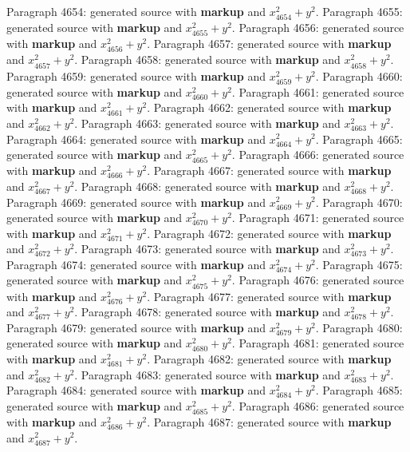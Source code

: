 \documentclass{article}
\begin{document}
Paragraph 4654: generated source with \textbf{markup} and $x_{4654}^2 + y^2$.
Paragraph 4655: generated source with \textbf{markup} and $x_{4655}^2 + y^2$.
Paragraph 4656: generated source with \textbf{markup} and $x_{4656}^2 + y^2$.
Paragraph 4657: generated source with \textbf{markup} and $x_{4657}^2 + y^2$.
Paragraph 4658: generated source with \textbf{markup} and $x_{4658}^2 + y^2$.
Paragraph 4659: generated source with \textbf{markup} and $x_{4659}^2 + y^2$.
Paragraph 4660: generated source with \textbf{markup} and $x_{4660}^2 + y^2$.
Paragraph 4661: generated source with \textbf{markup} and $x_{4661}^2 + y^2$.
Paragraph 4662: generated source with \textbf{markup} and $x_{4662}^2 + y^2$.
Paragraph 4663: generated source with \textbf{markup} and $x_{4663}^2 + y^2$.
Paragraph 4664: generated source with \textbf{markup} and $x_{4664}^2 + y^2$.
Paragraph 4665: generated source with \textbf{markup} and $x_{4665}^2 + y^2$.
Paragraph 4666: generated source with \textbf{markup} and $x_{4666}^2 + y^2$.
Paragraph 4667: generated source with \textbf{markup} and $x_{4667}^2 + y^2$.
Paragraph 4668: generated source with \textbf{markup} and $x_{4668}^2 + y^2$.
Paragraph 4669: generated source with \textbf{markup} and $x_{4669}^2 + y^2$.
Paragraph 4670: generated source with \textbf{markup} and $x_{4670}^2 + y^2$.
Paragraph 4671: generated source with \textbf{markup} and $x_{4671}^2 + y^2$.
Paragraph 4672: generated source with \textbf{markup} and $x_{4672}^2 + y^2$.
Paragraph 4673: generated source with \textbf{markup} and $x_{4673}^2 + y^2$.
Paragraph 4674: generated source with \textbf{markup} and $x_{4674}^2 + y^2$.
Paragraph 4675: generated source with \textbf{markup} and $x_{4675}^2 + y^2$.
Paragraph 4676: generated source with \textbf{markup} and $x_{4676}^2 + y^2$.
Paragraph 4677: generated source with \textbf{markup} and $x_{4677}^2 + y^2$.
Paragraph 4678: generated source with \textbf{markup} and $x_{4678}^2 + y^2$.
Paragraph 4679: generated source with \textbf{markup} and $x_{4679}^2 + y^2$.
Paragraph 4680: generated source with \textbf{markup} and $x_{4680}^2 + y^2$.
Paragraph 4681: generated source with \textbf{markup} and $x_{4681}^2 + y^2$.
Paragraph 4682: generated source with \textbf{markup} and $x_{4682}^2 + y^2$.
Paragraph 4683: generated source with \textbf{markup} and $x_{4683}^2 + y^2$.
Paragraph 4684: generated source with \textbf{markup} and $x_{4684}^2 + y^2$.
Paragraph 4685: generated source with \textbf{markup} and $x_{4685}^2 + y^2$.
Paragraph 4686: generated source with \textbf{markup} and $x_{4686}^2 + y^2$.
Paragraph 4687: generated source with \textbf{markup} and $x_{4687}^2 + y^2$.
\end{document}
